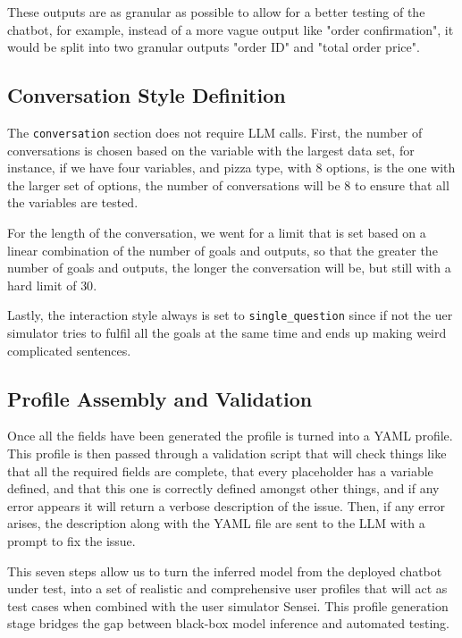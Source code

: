 These outputs are as granular as possible
to allow for a better testing of the chatbot,
for example, instead of a more vague output like
"order confirmation", it would be split into two granular outputs
"order ID" and "total order price".

\subsection{Conversation Style Definition}

The \texttt{conversation} section does not require \ac{LLM} calls.
First, the number of conversations is chosen
based on the variable with the largest data set,
for instance, if we have four variables,
and pizza type, with $8$ options, is the one with the larger set of options,
the number of conversations will be $8$ to ensure that all the variables are tested.

For the length of the conversation,
we went for a limit that is set based
on a linear combination of the number of goals and outputs,
so that the greater the number of goals and outputs,
the longer the conversation will be,
but still with a hard limit of $30$.

Lastly, the interaction style always is set to \texttt{single\_question}
since if not the uer simulator tries to fulfil all the goals at the same time
and ends up making weird complicated sentences.

\subsection{Profile Assembly and Validation}

Once all the fields have been generated
the profile is turned into a YAML profile.
This profile is then passed through a validation script
that will check things like that all the required fields are complete,
that every placeholder has a variable defined,
and that this one is correctly defined
amongst other things,
and if any error appears it will return a verbose description of the issue.
Then, if any error arises, the description along with the YAML file
are sent to the \ac{LLM} with a prompt to fix the issue.


This seven steps allow us to turn the inferred model
from the deployed chatbot under test,
into a set of realistic and comprehensive user profiles
that will act as test cases when combined with the user simulator Sensei.
This profile generation stage bridges the gap between
black-box model inference and automated testing.
